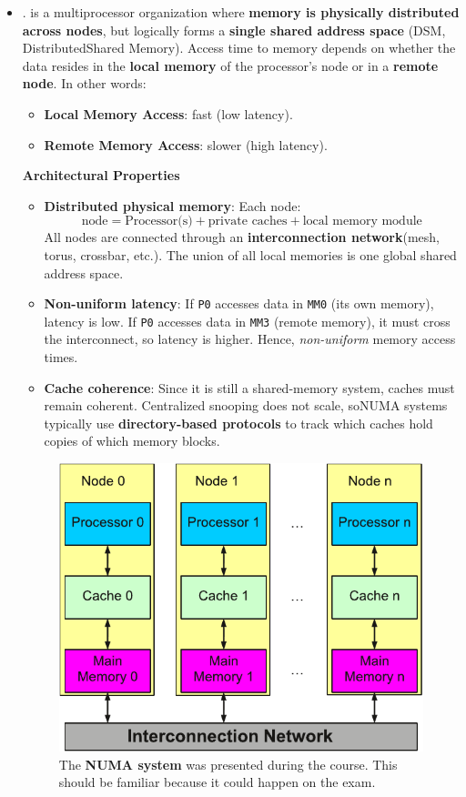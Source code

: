 \begin{itemize}
    \newpage


    \item {}.  is a multiprocessor organization where \textbf{memory is physically distributed across nodes}, but logically forms a \textbf{single shared address space} (DSM, Distributed\break Shared Memory). Access time to memory depends on whether the data resides in the \textbf{local memory} of the processor's node or in a \textbf{remote node}. In other words:
    \begin{itemize}
        \item \textbf{Local Memory Access}: fast (low latency).
        \item \textbf{Remote Memory Access}: slower (high latency).
    \end{itemize}
    \textcolor{Green3}{ \textbf{Architectural Properties}}
    \begin{itemize}
        \item \textbf{Distributed physical memory}: Each node:
        \begin{equation*}
            \text{node} = \text{Processor(s)} + \text{private caches} + \text{local memory module}
        \end{equation*}
        All nodes are connected through an \textbf{interconnection network}\break (mesh, torus, crossbar, etc.). The union of all local memories is one global shared address space.
        \item \textbf{Non-uniform latency}: If \texttt{P0} accesses data in \texttt{MM0} (its own memory), latency is low. If \texttt{P0} accesses data in \texttt{MM3} (remote memory), it must cross the interconnect, so latency is higher. Hence, \emph{non-uniform} memory access times.
        \item \textbf{Cache coherence}: Since it is still a shared-memory system, caches must remain coherent. Centralized snooping does not scale, so\break NUMA systems typically use \textbf{directory-based protocols} to track which caches hold copies of which memory blocks.
    \end{itemize}

    \begin{figure}[!htp]
        \centering
        \includegraphics[width=.65\textwidth]{img/numa-polimi.pdf}
        \caption{The \textbf{NUMA system} was presented during the course. This should be familiar because it could happen on the exam.\cite{course-slides-polimi}}
    \end{figure}


\end{itemize}
